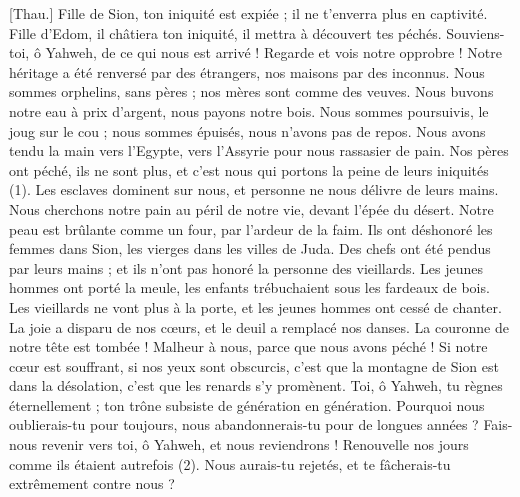 \begin{multicols}{2}
[Thau.] Fille de Sion, ton iniquité est expiée ; il ne t'enverra plus en captivité. Fille d’Edom, il châtiera ton iniquité, il mettra à découvert tes péchés.
\VerseOne{}Souviens-toi, ô Yahweh, de ce qui nous est arrivé ! Regarde et vois notre opprobre !
Notre héritage a été renversé par des étrangers, nos maisons par des inconnus.
Nous sommes orphelins, sans pères ; nos mères sont comme des veuves.
Nous buvons notre eau à prix d’argent, nous payons notre bois.
Nous sommes poursuivis, le joug sur le cou ; nous sommes épuisés, nous n’avons pas de repos.
Nous avons tendu la main vers l'Egypte, vers l'Assyrie pour nous rassasier de pain.
Nos pères ont péché, ils ne sont plus, et c’est nous qui portons la peine de leurs iniquités  (1).
Les esclaves dominent sur nous, et personne ne nous délivre de leurs mains.
Nous cherchons notre pain au péril de notre vie, devant l’épée du désert.
Notre peau est brûlante comme un four, par l’ardeur de la faim.
Ils ont déshonoré les femmes dans Sion, les vierges dans les villes de Juda.
Des chefs ont été pendus par leurs mains ; et ils n'ont pas honoré la personne des vieillards.
Les jeunes hommes ont porté la meule, les enfants trébuchaient sous les fardeaux de bois.
Les vieillards ne vont plus à la porte, et les jeunes hommes ont cessé de chanter.
La joie a disparu de nos cœurs, et le deuil a remplacé nos danses.
La couronne de notre tête est tombée ! Malheur à nous, parce que nous avons péché !
Si notre cœur est souffrant, si nos yeux sont obscurcis,
c'est que la montagne de Sion est dans la désolation, c'est que les renards s'y promènent.
Toi, ô Yahweh, tu règnes éternellement ;  ton trône subsiste de génération en génération.
Pourquoi nous oublierais-tu pour toujours, nous abandonnerais-tu pour de longues années ?
Fais-nous revenir vers toi, ô Yahweh, et nous reviendrons ! Renouvelle nos jours comme ils étaient autrefois (2).
Nous aurais-tu rejetés, et te fâcherais-tu extrêmement contre nous ?
\PPE{}
\end{multicols}